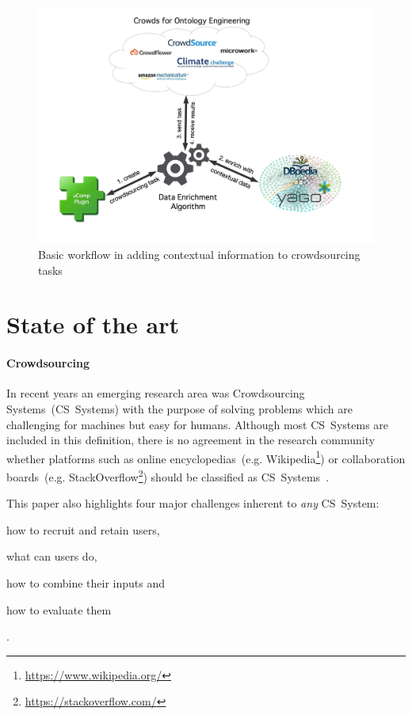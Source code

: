 \documentclass[12pt, notitlepage]{article}
\begin{document}
\begin{figure}[H]
	 \includegraphics[width=\textwidth]{graphics/new_architecture}
	 \caption{Basic workflow in adding contextual information to crowdsourcing tasks}\label{fig:new_architecture}
\end{figure}

\section{State of the art}
\paragraph{Crowdsourcing}
In recent years an emerging research area was Crowdsourcing Systems~(CS~Systems) with the purpose of solving problems which are challenging for machines but easy for humans. Although most CS~Systems are included in this definition, there is no agreement in the research community whether platforms such as online encyclopedias~(e.g. Wikipedia\footnote{\url{https://www.wikipedia.org/}}) or collaboration boards~(e.g. StackOverflow\footnote{\url{https://stackoverflow.com/}}) should be classified as CS~Systems~\cite{crowdsourcingsystems2011}. 

This paper also highlights four major challenges inherent to \emph{any} CS~System: 
\begin{inparaenum}[1)]
		\item how to recruit and retain users, 
		\item what can users do, 
		\item how to combine their inputs and
		\item how to evaluate them
\end{inparaenum}.
\end{document}
